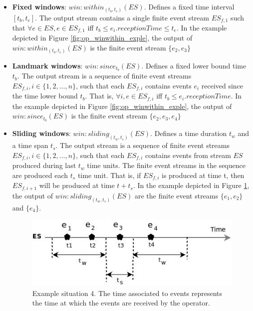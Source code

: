 \begin{itemize} 
\item \textbf{Fixed windows}: $win:within_{(t_b, t_e)}(ES)$. Defines a fixed time interval $[t_b, t_e]$. The output stream contains a single finite event stream $ES_{f,1}$ such that $\forall e \in ES, e \in ES_{f,1}$ iff $t_b \leq e_i.receptionTime \leq t_e $. In the example depicted in Figure \ref{fig:op_winwithin_exple}, the output of $win:within_{(t_b, t_e)}(ES)$ is the finite event stream $\{e_2, e_3\}$ 
\item \textbf{Landmark windows}: $win:since_{t_b}(ES)$. Defines a fixed lower bound time $t_b$. The output stream is a sequence of finite event streams $ES_{f,i}, i \in \{1, 2, …, n\}$, such that each $ES_{f,i}$ contains events $e_i$ received since the time lower bound $t_b$. That is, $\forall i, e \in ES_{f,i}$ iff $t_b \leq e_i.receptionTime$.
In the example depicted in Figure \ref{fig:op_winwithin_exple}, the output of $win:since_{t_b}(ES)$ is the finite event stream $\{e_2, e_3, e_4\}$ 
\item \textbf{Sliding windows}: $win:sliding_{(t_w, t_s)}(ES)$. Defines a time duration $t_w$ and a time span $t_s$. The output stream is a sequence of finite event streams  $ES_{f,i}, i \in \{1, 2, …, n\}$, such that each $ES_{f,i}$ contains events from stream $ES$ produced 
during last $t_w$ time units. The finite event streams in the sequence are produced each $t_s$ time unit. That is, if $ES_{f,i}$ is produced at time t, then $ES_{f,i+1}$ will be produced at time $t+t_s$.
In the example depicted in Figure \ref{fig:op_winsliding_exple}, the output of $win:sliding_{(t_w, t_s)}(ES)$ are the finite event streams $\{e_1, e_2\}$ and $\{e_4\}$.
\begin{figure}[h]
  \begin{center}
    \includegraphics[scale=0.65]{chap3/images/winslidingExample.jpeg}
  \end{center}
  \caption{Example situation 4. The time associated to events represents the time at which the events are received by the operator.}
  \label{fig:op_winsliding_exple}
\end{figure}
\end{itemize}
